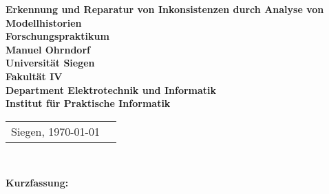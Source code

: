 \begin{titlepage}
    \begin{center}
    \huge \textbf{\textsf{Erkennung und Reparatur von Inkonsistenzen durch
    Analyse von Modellhistorien}}
    \\
    \vspace{2cm}
    \LARGE\textbf{Forschungspraktikum}\\
    \LARGE\textbf{Manuel Ohrndorf}\\
    \vspace{3.5cm}
    \large \textbf{Universität Siegen}\\
    \large \textbf{Fakultät IV}\\
    \large \textbf{Department Elektrotechnik und Informatik}\\
    \large \textbf{Institut für Praktische Informatik}\\
    \vspace{6.0cm}
    \end{center}
  \normalsize{
    \centering
    \begin{tabular}{ll}
      \large Siegen, \today  \\
    \end{tabular}\\
  }
\end{titlepage}

\cleardoublepage
\pagestyle{empty}

\textbf{Kurzfassung:}\hspace{0.0cm}

\cleardoublepage